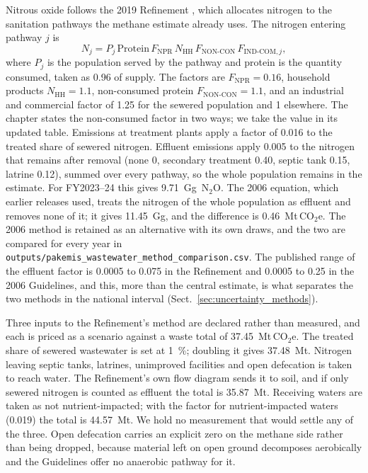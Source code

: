 \documentclass[essd]{copernicus}
\begin{document}
Nitrous oxide follows the 2019 Refinement \citep{IPCC2019}, which allocates nitrogen to the sanitation pathways the methane estimate already uses. The nitrogen entering pathway $j$ is
\begin{equation}
 N_j=P_j\,\mathrm{Protein}\,F_{\mathrm{NPR}}\,N_{\mathrm{HH}}\,
 F_{\mathrm{NON\text{-}CON}}\,F_{\mathrm{IND\text{-}COM},j},
 \label{eq:wastewater_nitrogen}
\end{equation}
where $P_j$ is the population served by the pathway and protein is the quantity consumed, taken as 0.96 of supply. The factors are $F_{\mathrm{NPR}}=0.16$, household products $N_{\mathrm{HH}}=1.1$, non-consumed protein $F_{\mathrm{NON\text{-}CON}}=1.1$, and an industrial and commercial factor of 1.25 for the sewered population and 1 elsewhere. The chapter states the non-consumed factor in two ways; we take the value in its updated table. Emissions at treatment plants apply a factor of 0.016 to the treated share of sewered nitrogen. Effluent emissions apply 0.005 to the nitrogen that remains after removal (none 0, secondary treatment 0.40, septic tank 0.15, latrine 0.12), summed over every pathway, so the whole population remains in the estimate. For FY2023--24 this gives \SI{9.71}{\giga\gram}~N$_2$O. The 2006 equation, which earlier releases used, treats the nitrogen of the whole population as effluent and removes none of it; it gives \SI{11.45}{\giga\gram}, and the difference is \SI{0.46}{\mega\tonne}\,CO$_2$e. The 2006 method is retained as an alternative with its own draws, and the two are compared for every year in \texttt{outputs/pakemis\_wastewater\_method\_comparison.csv}. The published range of the effluent factor is 0.0005 to 0.075 in the Refinement and 0.0005 to 0.25 in the 2006 Guidelines, and this, more than the central estimate, is what separates the two methods in the national interval (Sect.~\ref{sec:uncertainty_methods}).

Three inputs to the Refinement's method are declared rather than measured, and each is priced as a scenario against a waste total of \SI{37.45}{\mega\tonne}\,CO$_2$e. The treated share of sewered wastewater is set at \SI{1}{\percent}; doubling it gives \SI{37.48}{\mega\tonne}. Nitrogen leaving septic tanks, latrines, unimproved facilities and open defecation is taken to reach water. The Refinement's own flow diagram sends it to soil, and if only sewered nitrogen is counted as effluent the total is \SI{35.87}{\mega\tonne}. Receiving waters are taken as not nutrient-impacted; with the factor for nutrient-impacted waters (\num{0.019}) the total is \SI{44.57}{\mega\tonne}. We hold no measurement that would settle any of the three. Open defecation carries an explicit zero on the methane side rather than being dropped, because material left on open ground decomposes aerobically and the Guidelines offer no anaerobic pathway for it.
\end{document}
